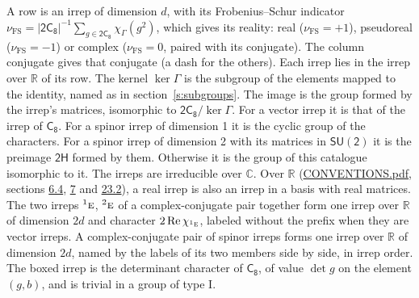 \documentclass[10pt,a4paper]{article}
\numberwithin{equation}{section}
\newcommand{\grp}[1]{\mathsf{#1}}
\newcommand{\irr}[1]{\text{\normalfont\scshape #1}}
\newcommand{\conjpair}[1]{{}^{#1}}
\newcommand{\irchar}[1]{\chi_{#1}}
\newcommand{\fsind}{\nu_{\mathrm{FS}}}
\begin{document}
\leavevmode\label{n:index.frobenius}\label{n:head.irrep}\label{n:head.reality}A row is an irrep of dimension $d$, with its Frobenius--Schur indicator $\fsind = |\grp{2C_{8}}|^{-1}\allowbreak\sum_{g\in\grp{2C_{8}}}\irchar{\Gamma}(g^2)$, which gives its reality: real ($\fsind = +1$), pseudoreal ($\fsind = -1$) or complex ($\fsind = 0$, paired with its conjugate). \label{n:head.conjugate}The column conjugate gives that conjugate (a dash for the others). \label{n:head.over.real}Each irrep lies in the irrep over $\mathbb{R}$ of its row. \label{n:head.kernel}The kernel $\ker\Gamma$ is the subgroup of the elements mapped to the identity, named as in section~\ref{s:subgroups}. \label{n:head.image}The image is the group formed by the irrep's matrices, isomorphic to $\grp{2C_{8}}/\ker\Gamma$. For a vector irrep it is that of the irrep of \href{../../../rotation/data/pdf/C8.pdf}{$\grp{C_{8}}$}. For a spinor irrep of dimension 1 it is the cyclic group of the characters. For a spinor irrep of dimension 2 with its matrices in $\grp{SU(2)}$ it is the preimage $\grp{2H}$ formed by them. Otherwise it is the group of this catalogue isomorphic to it. The irreps are irreducible over $\mathbb{C}$. Over $\mathbb{R}$ (\href{../../CONVENTIONS.pdf}{CONVENTIONS.pdf}, sections \href{../../../rotation/CONVENTIONS.pdf\#conv.6.4}{6.4}, \href{../../../rotation/CONVENTIONS.pdf\#conv.7}{7} and \href{../../CONVENTIONS.pdf\#conv.23.2}{23.2}), a real irrep is also an irrep in a basis with real matrices. The two irreps $\conjpair{1}\irr{e}$, $\conjpair{2}\irr{e}$ of a complex-conjugate pair together form one irrep over $\mathbb{R}$ of dimension $2d$ and character $2\operatorname{Re}\irchar{\conjpair{1}\irr{e}}$, labeled without the prefix when they are vector irreps. A complex-conjugate pair of spinor irreps forms one irrep over $\mathbb{R}$ of dimension $2d$, named by the labels of its two members side by side, in irrep order. \label{n:mark.determinant}The boxed irrep is the determinant character of \href{../../../rotation/data/pdf/C8.pdf}{$\grp{C_{8}}$}, of value $\det g$ on the element $(g, b)$, and is trivial in a group of type I.
\setlength{\emergencystretch}{2em}\par\setlength{\emergencystretch}{0pt}
\end{document}
